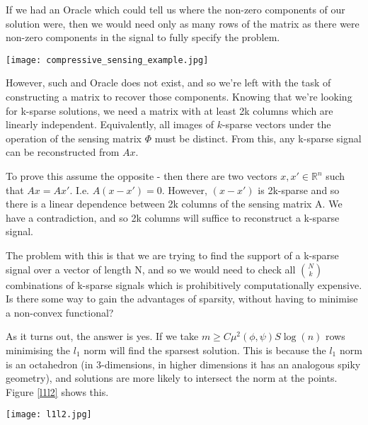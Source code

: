 If we had an Oracle which could tell us where the non-zero components of our solution were, then we would need only as many rows of the matrix as there were non-zero components in the signal to fully specify the problem. 

\begin{figure*}[h]
\centering
\texttt{[image: compressive\_sensing\_example.jpg]}
\caption{A visualisation of the Compressive Sensing problem as an under-determined system}
\label{l1l2}
\end{figure*}

However, such and Oracle does not exist, and so we're left with the task of constructing a matrix to recover those components. Knowing that we're looking for k-sparse solutions, we need a matrix with at least 2k columns which are linearly independent. Equivalently, all images of \(k\)-sparse vectors under the operation of the sensing matrix \(\Phi\) must be distinct. From this, any k-sparse signal can be reconstructed from \(Ax\). 

To prove this assume the opposite - then there are two vectors \(x, x' \in \mathbb{R}^n\) such that \(Ax = Ax'\). I.e. \(A(x-x') = 0\). However, \((x-x')\) is 2k-sparse and so there is a linear dependence between 2k columns of the sensing matrix A. We have a contradiction, and so 2k columns will suffice to reconstruct a k-sparse signal. 

The problem with this is that we are trying to find the support of a k-sparse signal over a vector of length N, and so we would need to check all \(N \choose k\) combinations of k-sparse signals which is prohibitively computationally expensive. Is there some way to gain the advantages of sparsity, without having to minimise a non-convex functional?

As it turns out, the answer is yes. If we take \( m \geq C \mu^2(\phi, \psi) S \log\left(n\right) \) rows minimising the \(l_{1}\) norm will find the sparsest solution. This is because the \(l_1\) norm is an octahedron (in 3-dimensions, in higher dimensions it has an analogous spiky geometry), and solutions are more likely to intersect the norm at the points. Figure \ref{l1l2} shows this.

\begin{figure*}[h]
\centering
\texttt{[image: l1l2.jpg]}
\caption{Solutions to the Compressive Sensing optimisation problem intersect the \(l_1\) norm the points where all components (but one) of the vector are zero (i.e. it is sparsity promoting) \cite{Tibshirani1996}}
\label{l1l2}
\end{figure*}

